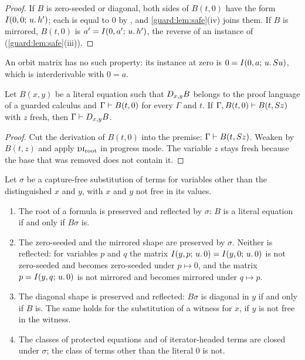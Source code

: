 \begin{proof}
If $B$ is zero-seeded or diagonal, both sides of $B(t,0)$ have the form
$I(0,0;\,u.\,h')$; each is equal to $0$ by , and
\cref{guard:lem:safe}(iv) joins them.  If $B$ is mirrored, $B(t,0)$ is
$a'=I(0,a';\,u.\,h')$, the reverse of an instance of 
(\cref{guard:lem:safe}(iii)).
\end{proof}

An orbit matrix has no such property: its instance at zero is
$0=I(0,a;\,u.\,S u)$, which is interderivable with $0=a$.

\begin{lemma}
\label{guard:lem:atomcases}
Let $B(x,y)$ be a literal equation such that $D_{x,y}B$ belongs to the
proof language of a guarded calculus and $\Gamma\vdash B(t,0)$ for every
$\Gamma$ and $t$.  If $\Gamma,B(t,0)\vdash B(t,S z)$ with $z$ fresh,
then $\Gamma\vdash D_{x,y}B$.
\end{lemma}

\begin{proof}
Cut the derivation of $B(t,0)$ into the premise: $\Gamma\vdash
B(t,S z)$.  Weaken by $B(t,z)$ and apply $\rulename{DI}_{\mathrm{root}}$
in progress mode.  The variable $z$ stays fresh because the base that was
removed does not contain it.
\end{proof}

\begin{proposition}
\label{guard:prop:subst-shapes}
Let $\sigma$ be a capture-free substitution of terms for variables other
than the distinguished $x$ and $y$, with $x$ and $y$ not free in its values.
\begin{enumerate}[label=\textup{(\roman*)}]
\item The root of a formula is preserved and reflected by $\sigma$: $B$ is a
 literal equation if and only if $B\sigma$ is.
\item The zero-seeded and the mirrored shape are preserved by $\sigma$.
 Neither is reflected: for variables $p$ and $q$ the matrix
 $I(y,p;\,u.\,0)=I(y,0;\,u.\,0)$ is not zero-seeded and becomes
 zero-seeded under $p\mapsto 0$, and the matrix $p=I(y,q;\,u.\,0)$ is not
 mirrored and becomes mirrored under $q\mapsto p$.
\item The diagonal shape is preserved and reflected: $B\sigma$ is diagonal
 in $y$ if and only if $B$ is.  The same holds for the substitution of a
 witness for $x$, if $y$ is not free in the witness.
\item The classes of protected equations and of iterator-headed terms are
 closed under $\sigma$; the class of terms other than the literal $0$ is
 not.
\end{enumerate}
\end{proposition}


